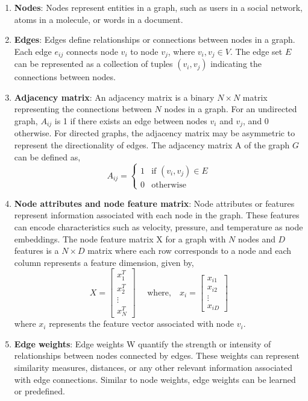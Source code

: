\begin{enumerate}
  \item \textbf{Nodes}: Nodes represent entities in a graph, such as users in a social network, atoms in a molecule, or words in a document. 
  \item \textbf{Edges}: Edges define relationships or connections between nodes in a graph. Each edge \( e_{ij} \) connects node \( v_i \) to node \( v_j \), where \( v_i, v_j \in V \). The edge set $E$ can be represented as a collection of tuples \( (v_i, v_j) \) indicating the connections between nodes.
  \item \textbf{Adjacency matrix}: An adjacency matrix is a binary $N \times N$ matrix representing the connections between $N$ nodes in a graph. For an undirected graph, \( A_{ij} \) is 1 if there exists an edge between nodes \( v_i \) and \( v_j \), and 0 otherwise. For directed graphs, the adjacency matrix may be asymmetric to represent the directionality of edges. The adjacency matrix \gls{A} of the graph \( G \) can be defined as,
  \[
  A_{ij} = \begin{cases} 1 & \text{if } (v_i, v_j) \in E \\ 0 & \text{otherwise} \end{cases}
  \]
  \item \textbf{Node attributes and node feature matrix}: Node attributes or features represent information associated with each node in the graph. These features can encode characteristics such as velocity, pressure, and temperature as node embeddings. The node feature matrix \gls{X} for a graph with \( N \) nodes and \( D \) features is a $N \times D$ matrix where each row corresponds to a node and each column represents a feature dimension, given by,
\begin{equation*}
  X = \begin{bmatrix} x_1^T \\ x_2^T \\ \vdots \\ x_N^T \end{bmatrix} \quad \text{ where,} \quad x_i = \begin{bmatrix} x_{i1} \\ x_{i2} \\ \vdots \\ x_{iD} \end{bmatrix}
\end{equation*}
where \( x_i \) represents the feature vector associated with node \(v_i \).
  \item \textbf{Edge weights}: Edge weights \gls{W} quantify the strength or intensity of relationships between nodes connected by edges. These weights can represent similarity measures, distances, or any other relevant information associated with edge connections. Similar to node weights, edge weights can be learned or predefined. 
\end{enumerate}  
